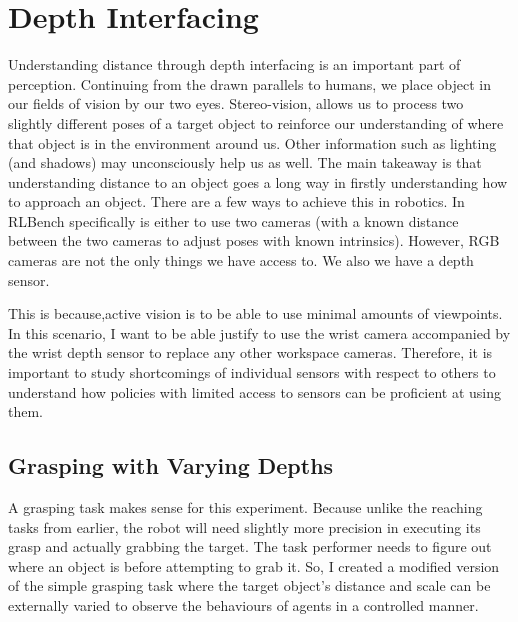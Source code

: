 \section{Depth Interfacing}\label{sec:depth-interfacing}
Understanding distance through depth interfacing is an important part of perception. Continuing from the drawn parallels to humans, we place object in our fields of vision by our two eyes. Stereo-vision, allows us to process two slightly different poses of a target object to reinforce our understanding of where that object is in the environment around us. Other information such as lighting (and shadows) may unconsciously help us as well. The main takeaway is that understanding distance to an object goes a long way in firstly understanding how to approach an object. There are a few ways to achieve this in robotics. In RLBench specifically is either to use two cameras (with a known distance between the two cameras to adjust poses with known intrinsics). However, RGB cameras are not the only things we have access to. We also we have a depth sensor.

This is because,active vision is to be able to use minimal amounts of viewpoints. In this scenario, I want to be able justify to use the wrist camera accompanied by the wrist depth sensor to replace any other workspace cameras. Therefore, it is important to study shortcomings of individual sensors with respect to others to understand how policies with limited access to sensors can be proficient at using them.

\subsection{Grasping with Varying Depths}
A grasping task makes sense for this experiment. Because unlike the reaching tasks from earlier, the robot will need slightly more precision in executing its grasp and actually grabbing the target. The task performer needs to figure out where an object is before attempting to grab it. So, I created a modified version of the simple grasping task where the target object's distance and scale can be externally varied to observe the behaviours of agents in a controlled manner.

